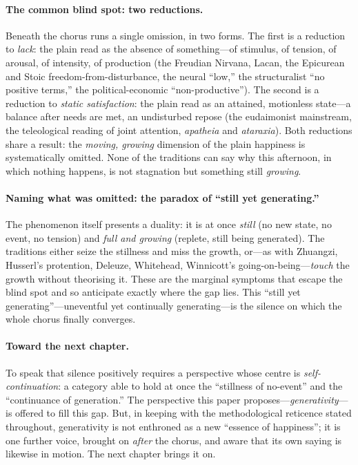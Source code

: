 \paragraph{The common blind spot: two reductions.} Beneath the chorus runs a single omission, in two forms. The first is a reduction to \emph{lack}: the plain read as the absence of something---of stimulus, of tension, of arousal, of intensity, of production (the Freudian Nirvana, Lacan, the Epicurean and Stoic freedom-from-disturbance, the neural ``low,'' the structuralist ``no positive terms,'' the political-economic ``non-productive''). The second is a reduction to \emph{static satisfaction}: the plain read as an attained, motionless state---a balance after needs are met, an undisturbed repose (the eudaimonist mainstream, the teleological reading of joint attention, \emph{apatheia} and \emph{ataraxia}). Both reductions share a result: the \emph{moving, growing} dimension of the plain happiness is systematically omitted. None of the traditions can say why this afternoon, in which nothing happens, is not stagnation but something still \emph{growing}.

\paragraph{Naming what was omitted: the paradox of ``still yet generating.''} The phenomenon itself presents a duality: it is at once \emph{still} (no new state, no event, no tension) and \emph{full and growing} (replete, still being generated). The traditions either seize the stillness and miss the growth, or---as with Zhuangzi, Husserl's protention, Deleuze, Whitehead, Winnicott's going-on-being---\emph{touch} the growth without theorising it. These are the marginal symptoms that escape the blind spot and so anticipate exactly where the gap lies. This ``still yet generating''---uneventful yet continually generating---is the silence on which the whole chorus finally converges.

\paragraph{Toward the next chapter.} To speak that silence positively requires a perspective whose centre is \emph{self-continuation}: a category able to hold at once the ``stillness of no-event'' and the ``continuance of generation.'' The perspective this paper proposes---\emph{generativity}---is offered to fill this gap. But, in keeping with the methodological reticence stated throughout, generativity is not enthroned as a new ``essence of happiness''; it is one further voice, brought on \emph{after} the chorus, and aware that its own saying is likewise in motion. The next chapter brings it on.
